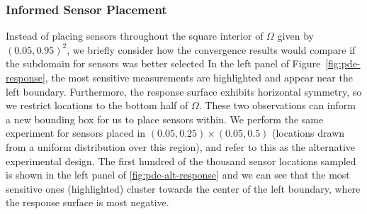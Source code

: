 \FloatBarrier
\subsubsection{Informed Sensor Placement}
Instead of placing sensors throughout the square interior of $\Omega$ given by $(0.05, 0.95)^2$, we briefly consider how the convergence results would compare if the subdomain for sensors was better selected
In the left panel of Figure~\ref{fig:pde-response}, the most sensitive measurements are highlighted and appear near the left boundary.
Furthermore, the response surface exhibits horizontal symmetry, so we restrict locations to the bottom half of $\Omega$.
These two observations can inform a new bounding box for us to place sensors within.
We perform the same experiment for sensors placed in $(0.05, 0.25)\times(0.05, 0.5)$ (locations drawn from a uniform distribution over this region), and refer to this as the alternative experimental design.
The first hundred of the thousand sensor locations sampled is shown in the left panel of \ref{fig:pde-alt-response} and we can see that the most sensitive ones (highlighted) cluster towards the center of the left boundary, where the response surface is most negative.


